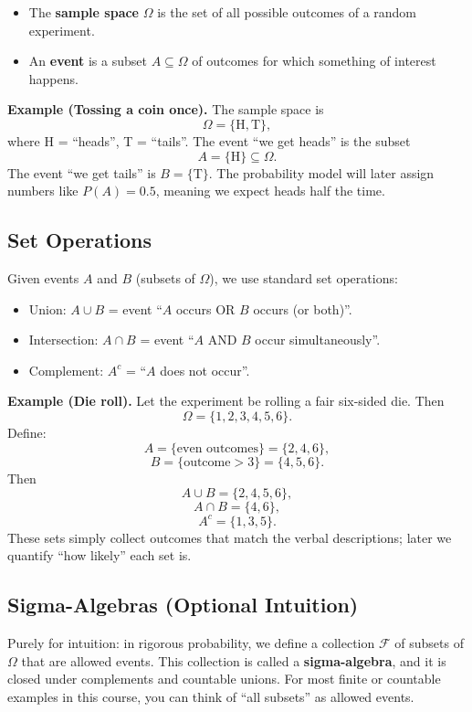 \documentclass[11pt,a4paper]{article}
\begin{document}
\begin{itemize}
    \item The \textbf{sample space} \(\Omega\) is the set of all possible outcomes of a random experiment.
    \item An \textbf{event} is a subset \(A \subseteq \Omega\) of outcomes for which something of interest happens.
\end{itemize}

\textbf{Example (Tossing a coin once).}  
The sample space is
\[
\Omega = \{\text{H}, \text{T}\},
\]
where H = ``heads'', T = ``tails''.  
The event ``we get heads'' is the subset
\[
A = \{\text{H}\} \subseteq \Omega.
\]
The event ``we get tails'' is \(B = \{\text{T}\}\).  
The probability model will later assign numbers like \(P(A) = 0.5\), meaning we expect heads half the time.

\subsection{Set Operations}

Given events \(A\) and \(B\) (subsets of \(\Omega\)), we use standard set operations:

\begin{itemize}
    \item Union: \(A \cup B\) = event ``\(A\) occurs OR \(B\) occurs (or both)''.
    \item Intersection: \(A \cap B\) = event ``\(A\) AND \(B\) occur simultaneously''.
    \item Complement: \(A^c\) = ``\(A\) does not occur''.
\end{itemize}

\textbf{Example (Die roll).}  
Let the experiment be rolling a fair six-sided die. Then
\[
\Omega = \{1,2,3,4,5,6\}.
\]
Define:
\[
A = \{\text{even outcomes}\} = \{2,4,6\},
\]
\[
B = \{\text{outcome} > 3\} = \{4,5,6\}.
\]
Then
\[
A \cup B = \{2,4,5,6\},
\]
\[
A \cap B = \{4,6\},
\]
\[
A^c = \{1,3,5\}.
\]
These sets simply collect outcomes that match the verbal descriptions; later we quantify ``how likely'' each set is.

\subsection{Sigma-Algebras (Optional Intuition)}

Purely for intuition: in rigorous probability, we define a collection \(\mathcal{F}\) of subsets of \(\Omega\) that are allowed events.  
This collection is called a \textbf{sigma-algebra}, and it is closed under complements and countable unions.  
For most finite or countable examples in this course, you can think of ``all subsets'' as allowed events.
\end{document}
